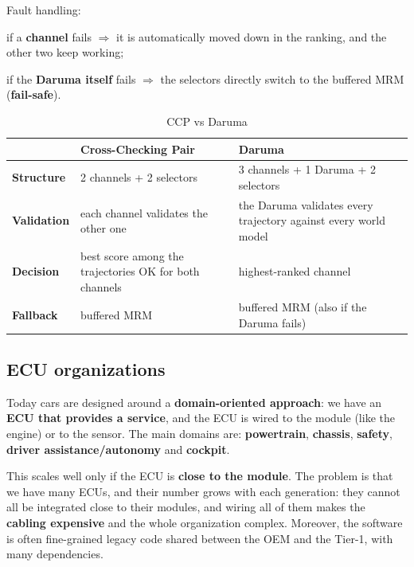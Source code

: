 Fault handling:
\begin{compactitemize}
    \item if a \textbf{channel} fails $\Rightarrow$ it is automatically moved down in the ranking, and the other two keep working;
    \item if the \textbf{Daruma itself} fails $\Rightarrow$ the selectors directly switch to the buffered MRM (\textbf{fail-safe}).
\end{compactitemize}

\begin{table}[H]
    \centering
    \begin{tabular}{|l|p{6cm}|p{6cm}|}
        \hline
         & \textbf{Cross-Checking Pair} & \textbf{Daruma} \\
        \hline
        \textbf{Structure}  & 2 channels + 2 selectors & 3 channels + 1 Daruma + 2 selectors \\
        \hline
        \textbf{Validation} & each channel validates the other one & the Daruma validates every trajectory against every world model \\
        \hline
        \textbf{Decision}   & best score among the trajectories OK for both channels & highest-ranked channel \\
        \hline
        \textbf{Fallback}   & buffered MRM & buffered MRM (also if the Daruma fails) \\
        \hline
    \end{tabular}
    \caption{CCP vs Daruma}
\end{table}

\subsection{ECU organizations}
Today cars are designed around a \textbf{domain-oriented approach}: we have an \textbf{ECU that provides a service}, and the ECU is wired to the module (like the engine) or to the sensor.
The main domains are: \textbf{powertrain}, \textbf{chassis}, \textbf{safety}, \textbf{driver assistance/autonomy} and \textbf{cockpit}.

This scales well only if the ECU is \textbf{close to the module}.
The problem is that we have many ECUs, and their number grows with each generation: they cannot all be integrated close to their modules, and wiring all of them makes the \textbf{cabling expensive} and the whole organization complex.
Moreover, the software is often fine-grained legacy code shared between the OEM and the Tier-1, with many dependencies.

